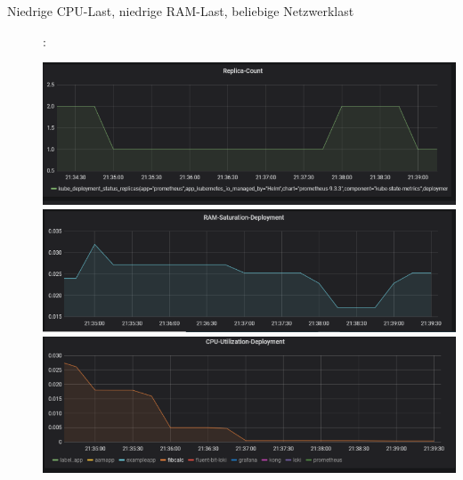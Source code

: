 \documentclass[a4paper,10pt]{scrartcl}
\begin{document}
\begin{description}

\item[Niedrige CPU-Last, niedrige RAM-Last, beliebige Netzwerklast]:\\

\begin{minipage}{\linewidth}
            \includegraphics[width=1\textwidth]{img/Herunterskalieren/ReplicaCount.PNG}\\
            
            \includegraphics[width=1\textwidth,height=.14\textheight]{img/Herunterskalieren/RAMSaturation.PNG}\\
            
  			\includegraphics[width=1\textwidth]{img/Herunterskalieren/CPUSaturation.PNG}			
\end{minipage}


\end{description}
\end{document}
